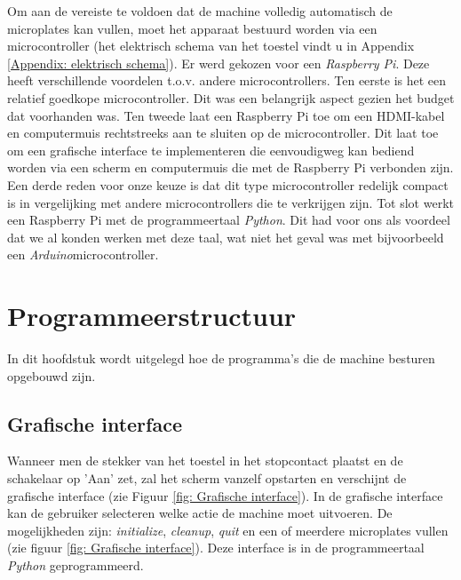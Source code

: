 \documentclass[a4paper,twoside,kulak]{kulakreport} %
\begin{document}
Om aan de vereiste te voldoen dat de machine volledig automatisch de microplates kan vullen, moet het apparaat bestuurd worden via een microcontroller (het elektrisch schema van het toestel vindt u in Appendix \ref{Appendix: elektrisch schema}). Er werd gekozen voor een \textit{Raspberry Pi}. Deze heeft verschillende voordelen t.o.v. andere microcontrollers. Ten eerste is het een relatief goedkope microcontroller. Dit was een belangrijk aspect gezien het budget dat voorhanden was. Ten tweede laat een Raspberry Pi toe om een HDMI-kabel en computermuis rechtstreeks aan te sluiten op de microcontroller. Dit laat toe om een grafische interface te implementeren die eenvoudigweg kan bediend worden via een scherm en computermuis die met de Raspberry Pi verbonden zijn. Een derde reden voor onze keuze is dat dit type microcontroller redelijk compact is in vergelijking met andere microcontrollers die te verkrijgen zijn. Tot slot werkt een Raspberry Pi met de programmeertaal \textit{Python}. Dit had voor ons als voordeel dat we al konden werken met deze taal, wat niet het geval was met bijvoorbeeld een \textit{Arduino}microcontroller. 



\chapter{Programmeerstructuur}

In dit hoofdstuk wordt uitgelegd hoe de programma's die de machine besturen opgebouwd zijn.

\section{Grafische interface}
Wanneer men de stekker van het toestel in het stopcontact plaatst en de schakelaar op 'Aan' zet, zal het scherm vanzelf opstarten en verschijnt de grafische interface (zie Figuur \ref{fig: Grafische interface}). In de grafische interface kan de gebruiker selecteren welke actie de machine moet uitvoeren. De mogelijkheden zijn: \textit{initialize}, \textit{cleanup}, \textit{quit} en een of meerdere microplates vullen (zie figuur \ref{fig: Grafische interface}). Deze interface is in de programmeertaal \textit{Python} geprogrammeerd. 
\end{document}
